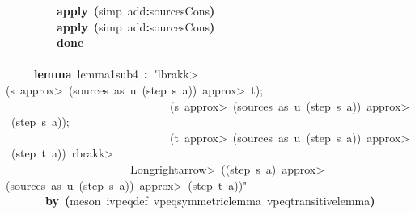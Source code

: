 \documentclass{article}
\newcommand{\syntaxKEYWORDA}[1]{\textcolor[rgb]{0.0,0.4,0.6}{\textbf{#1}}}
\newcommand{\syntaxLITERALA}[1]{\textcolor[rgb]{1.0,0.0,0.8}{#1}}
\newcommand{\syntaxOPERATOR}[1]{\textcolor[rgb]{0.0,0.0,0.0}{\textbf{#1}}}
\newcommand{\syntaxKEYWORDA}[1]{\textcolor[rgb]{0.0,0.4,0.6}{\textbf{#1}}}
\newcommand{\syntaxLITERALA}[1]{\textcolor[rgb]{1.0,0.0,0.8}{#1}}
\newcommand{\syntaxOPERATOR}[1]{\textcolor[rgb]{0.0,0.0,0.0}{\textbf{#1}}}
\newcommand{\syntaxKEYWORDA}[1]{\textcolor[rgb]{0.0,0.4,0.6}{\textbf{#1}}}
\newcommand{\syntaxLITERALA}[1]{\textcolor[rgb]{1.0,0.0,0.8}{#1}}
\newcommand{\syntaxOPERATOR}[1]{\textcolor[rgb]{0.0,0.0,0.0}{\textbf{#1}}}
\newcommand{\syntaxKEYWORDA}[1]{\textcolor[rgb]{0.0,0.4,0.6}{#1}}
\newcommand{\syntaxLITERALA}[1]{\textcolor[rgb]{1.0,0.0,0.8}{\textbf{#1}}}
\newcommand{\syntaxOPERATOR}[1]{\textcolor[rgb]{0.0,0.0,0.0}{#1}}
\newcommand{\syntaxKEYWORDA}[1]{\textcolor[rgb]{0.0,0.4,0.6}{\textbf{#1}}}
\newcommand{\syntaxLITERALA}[1]{\textcolor[rgb]{1.0,0.0,0.8}{#1}}
\newcommand{\syntaxOPERATOR}[1]{\textcolor[rgb]{0.0,0.0,0.0}{\textbf{#1}}}
\newcommand{\syntaxKEYWORDA}[1]{\textcolor[rgb]{0.0,0.4,0.6}{\textbf{#1}}}
\newcommand{\syntaxLITERALA}[1]{\textcolor[rgb]{1.0,0.0,0.8}{#1}}
\newcommand{\syntaxOPERATOR}[1]{\textcolor[rgb]{0.0,0.0,0.0}{\textbf{#1}}}
\begin{document}
{\ }{\ }{\ }{\ }{\ }{\ }{\ }{\ }{\ }\syntaxKEYWORDA{apply}{\ }\syntaxOPERATOR{(}simp{\ }add\syntaxOPERATOR{:}sources\usebox{\underscorebox}Cons\syntaxOPERATOR{)}\hspace*{\fill}\\
{\ }{\ }{\ }{\ }{\ }{\ }{\ }{\ }{\ }\syntaxKEYWORDA{apply}{\ }\syntaxOPERATOR{(}simp{\ }add\syntaxOPERATOR{:}sources\usebox{\underscorebox}Cons\syntaxOPERATOR{)}\hspace*{\fill}\\
{\ }{\ }{\ }{\ }{\ }{\ }{\ }{\ }{\ }\syntaxKEYWORDA{done}\hspace*{\fill}\\
\hspace*{\fill}\\
{\ }{\ }{\ }{\ }{\ }\syntaxKEYWORDA{lemma}{\ }lemma\usebox{\underscorebox}1\usebox{\underscorebox}sub\usebox{\underscorebox}4{\ }\syntaxOPERATOR{:}{\ }\syntaxLITERALA{"\<lbrakk>(s{\ }\<approx>{\ }(sources{\ }as{\ }u{\ }(step{\ }s{\ }a)){\ }\<approx>{\ }t);}\hspace*{\fill}\\
\syntaxLITERALA{{\ }{\ }{\ }{\ }{\ }{\ }{\ }{\ }{\ }{\ }{\ }{\ }{\ }{\ }{\ }{\ }{\ }{\ }{\ }{\ }{\ }{\ }{\ }{\ }{\ }{\ }{\ }{\ }{\ }(s{\ }\<approx>{\ }(sources{\ }as{\ }u{\ }(step{\ }s{\ }a)){\ }\<approx>{\ }(step{\ }s{\ }a));}\hspace*{\fill}\\
\syntaxLITERALA{{\ }{\ }{\ }{\ }{\ }{\ }{\ }{\ }{\ }{\ }{\ }{\ }{\ }{\ }{\ }{\ }{\ }{\ }{\ }{\ }{\ }{\ }{\ }{\ }{\ }{\ }{\ }{\ }{\ }(t{\ }\<approx>{\ }(sources{\ }as{\ }u{\ }(step{\ }s{\ }a)){\ }\<approx>{\ }(step{\ }t{\ }a)){\ }\<rbrakk>}\hspace*{\fill}\\
\syntaxLITERALA{{\ }{\ }{\ }{\ }{\ }{\ }{\ }{\ }{\ }{\ }{\ }{\ }{\ }{\ }{\ }{\ }{\ }{\ }{\ }{\ }{\ }{\ }\<Longrightarrow>{\ }((step{\ }s{\ }a){\ }\<approx>(sources{\ }as{\ }u{\ }(step{\ }s{\ }a)){\ }\<approx>{\ }(step{\ }t{\ }a))"}\hspace*{\fill}\\
{\ }{\ }{\ }{\ }{\ }{\ }{\ }\syntaxKEYWORDA{by}{\ }\syntaxOPERATOR{(}meson{\ }ivpeq\usebox{\underscorebox}def{\ }vpeq\usebox{\underscorebox}symmetric\usebox{\underscorebox}lemma{\ }vpeq\usebox{\underscorebox}transitive\usebox{\underscorebox}lemma\syntaxOPERATOR{)}\hspace*{\fill}\\
{\ }{\ }{\ }{\ }{\ }{\ }{\ }{\ }{\ }{\ }{\ }\hspace*{\fill}\\
\end{document}
